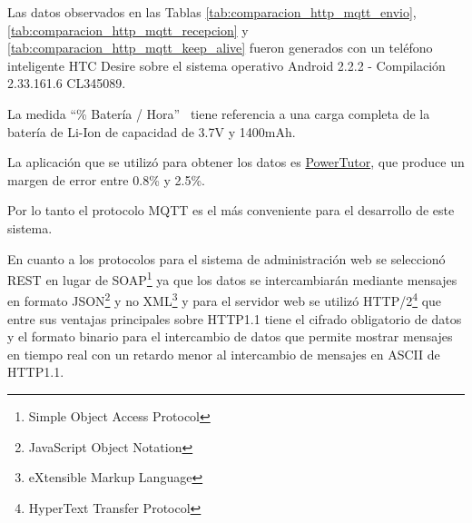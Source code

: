 \documentclass[../principal]{subfiles}
\begin{document}
  \begin{table}[H]
    \centering
    \caption{Comparación de recepción de mensajes entre HTTPS y MQTT}
    \caption*{Recibiendo 1024 mensajes con carga útil de 1 byte}
    
    \caption*{\textbf{Fuente:} \href{http://stephendnicholas.com/posts/power-profiling-mqtt-vs-https}{Power Profiling: HTTPS Long Polling vs. MQTT with SSL, on Android, Blog de Stephen Nicholas, 31 de Mayo de 2012}}
    \label{tab:comparacion_http_mqtt_recepcion}
  \end{table}

  \begin{table}[H]
    \centering
    \caption{Comparación de consumo de batería con señales de Keep Alive}
    
    \caption*{\textbf{Fuente:} \href{http://stephendnicholas.com/posts/power-profiling-mqtt-vs-https}{Power Profiling: HTTPS Long Polling vs. MQTT with SSL, on Android, Blog de Stephen Nicholas, 31 de Mayo de 2012}}
    \label{tab:comparacion_http_mqtt_keep_alive}
  \end{table}

  Las datos observados en las Tablas \ref{tab:comparacion_http_mqtt_envio}, \ref{tab:comparacion_http_mqtt_recepcion} y \ref{tab:comparacion_http_mqtt_keep_alive} fueron generados con un teléfono inteligente HTC Desire sobre el sistema operativo Android 2.2.2 - Compilación 2.33.161.6 CL345089.

  La medida ``\% Batería / Hora'' \ tiene referencia a una carga completa de la batería de Li-Ion de capacidad de 3.7V y 1400mAh.

  La aplicación que se utilizó para obtener los datos es \href{http://ziyang.eecs.umich.edu/projects/powertutor/}{PowerTutor}, que produce un margen de error entre 0.8\% y 2.5\%.

  Por lo tanto el protocolo MQTT es el más conveniente para el desarrollo de este sistema.

  En cuanto a los protocolos para el sistema de administración web se seleccionó REST en lugar de SOAP\footnote{Simple Object Access Protocol} ya que los datos se intercambiarán mediante mensajes en formato JSON\footnote{JavaScript Object Notation} y no XML\footnote{eXtensible Markup Language} y para el servidor web se utilizó HTTP/2\footnote{HyperText Transfer Protocol} que entre sus ventajas principales sobre HTTP1.1 tiene el cifrado obligatorio de datos y el formato binario para el intercambio de datos que permite mostrar mensajes en tiempo real con un retardo menor al intercambio de mensajes en ASCII de HTTP1.1.
\end{document}
